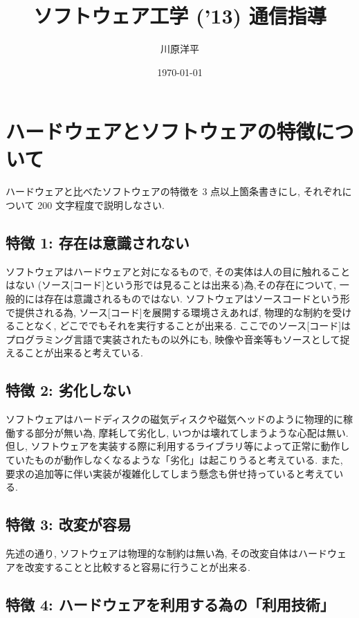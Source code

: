 \documentclass[a4paper]{jsarticle}
\title{ソフトウェア工学 ('13) 通信指導}
\author{川原洋平}
\date{\today}
\begin{document}
\maketitle
\section{ハードウェアとソフトウェアの特徴について}

ハードウェアと比べたソフトウェアの特徴を 3 点以上箇条書きにし, それぞれについて 200 文字程度で説明しなさい.

\subsection{特徴 1: 存在は意識されない}

ソフトウェアはハードウェアと対になるもので, その実体は人の目に触れることはない (ソース[コード]という形では見ることは出来る)為,その存在について, 一般的には存在は意識されるものではない. ソフトウェアはソースコードという形で提供される為, ソース[コード]を展開する環境さえあれば, 物理的な制約を受けることなく, どこででもそれを実行することが出来る. ここでのソース[コード]はプログラミング言語で実装されたもの以外にも, 映像や音楽等もソースとして捉えることが出来ると考えている.

\subsection{特徴 2: 劣化しない}

ソフトウェアはハードディスクの磁気ディスクや磁気ヘッドのように物理的に稼働する部分が無い為, 摩耗して劣化し, いつかは壊れてしまうような心配は無い. 但し, ソフトウェアを実装する際に利用するライブラリ等によって正常に動作していたものが動作しなくなるような「劣化」は起こりうると考えている. また, 要求の追加等に伴い実装が複雑化してしまう懸念も併せ持っていると考えている.

\subsection{特徴 3: 改変が容易}

先述の通り, ソフトウェアは物理的な制約は無い為, その改変自体はハードウェアを改変することと比較すると容易に行うことが出来る.

\subsection{特徴 4: ハードウェアを利用する為の「利用技術」}
\end{document}
